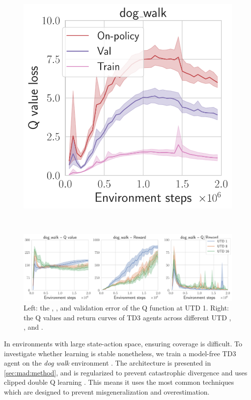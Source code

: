 \begin{figure}[t]
\begin{minipage}{0.25\textwidth}
    \includegraphics[width=\textwidth]{figures/mad-td/critic_loss_dog_walk.pdf}
\end{minipage}
~
\begin{minipage}{0.745\textwidth}
    \includegraphics[width=\textwidth]{figures/mad-td/q_overestimation.pdf}
\end{minipage}
\caption{Left: the , , and  validation error of the Q function at UTD 1. Right: the Q values and return curves of TD3 agents across different UTD , , and .}
\label{fig:mad:q_eval}
\end{figure}

In environments with large state-action space, ensuring coverage is difficult.
To investigate whether learning is stable nonetheless, we train a model-free TD3 agent on the \emph{dog walk} environment \parencite{tunyasuvunakool2020}.
The architecture is presented in \autoref{sec:mad:method}, and is regularized to prevent catastrophic divergence \parencite{hussing2024dissecting,nauman2024overestimation} and uses clipped double Q learning \parencite{fujimoto2018addressing}.
This means it uses the most common techniques which are designed to prevent misgeneralization and overestimation.

